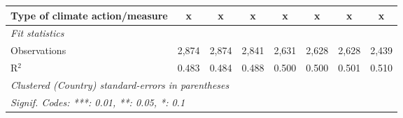 \begin{table}[htbp]
\begin{tabular}{lccccccc}
      Type of climate action/measure                                      & x             & x             & x             & x             & x             & x             & x\\  
      \midrule \emph{Fit statistics}\\
      Observations                                                        & 2,874         & 2,874         & 2,841         & 2,631         & 2,628         & 2,628         & 2,439\\  
      R$^2$                                                               & 0.483         & 0.484         & 0.488         & 0.500         & 0.500         & 0.501         & 0.510\\  
      \midrule
      \multicolumn{8}{l}{\emph{Clustered (Country) standard-errors in parentheses}}\\
      \multicolumn{8}{l}{\emph{Signif. Codes: ***: 0.01, **: 0.05, *: 0.1}}\\
   \end{tabular}
\end{table}


